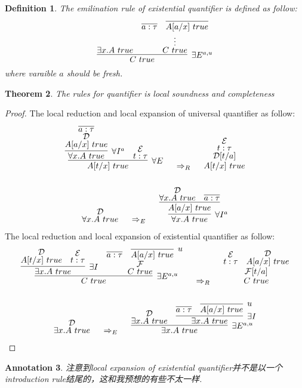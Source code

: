 \documentclass{article}
\theoremstyle{plain}
\newtheorem{theorem}{Theorem}
\newtheorem{definition}[theorem]{Definition}
\newtheorem{annotation}[theorem]{Annotation}
\theoremstyle{nonumberplain}
\newtheorem{proof}{Proof}
\begin{document}
\begin{definition}
\rm The emilination rule of existential quantifier is defined as follow:
$$
\infer[\exists E^{a,u}]{C~true}{\exists x.A~true & \deduce{C~true}{\deduce{\vdots}{\infer{a:\tau}{} & \infer{A[a/x]~true}{}}}}
$$
where varaible $a$ should be fresh. 
\end{definition}

\begin{theorem}
\rm The rules for quantifier is local soundness and completeness
\end{theorem}

\begin{proof}
\rm The local reduction and local expansion of universal quantifier as follow:
$$
\begin{gathered}
\infer[\forall E]{A[t/x]~true}{\infer[\forall I^a]{\forall x. A~true}{\deduce{A[a/x]~true}{\deduce{\mathcal{D}}{\infer{a:\tau}{}}}} & \deduce{t:\tau}{\mathcal{E}}} ~~~~ \Rightarrow_R~~~~ \deduce{A[t/x]~true}{\deduce{\mathcal{D}[t/a]}{\deduce{t:\tau}{\mathcal{E}}}} \\ \\
\deduce{\forall x. A~true}{\mathcal{D}} ~~~~ \Rightarrow_E ~~~~\infer[\forall I^a]{\forall x. A~true}{\infer{A[a/x]~true}{\deduce{\forall x. A~true}{\mathcal{D}} & \infer{ a: \tau}{}}}
\end{gathered}
$$
The local reduction and local expansion of existential quantifier as follow:
$$
\begin{gathered}
\infer[\exists E^{a,u}]{C~true}{\infer[\exists I]{\exists x. A~true}{\deduce{A[t/x]~true}{\mathcal{D}} & \deduce{t:\tau}{\mathcal{E}}} & \deduce{C~true}{\deduce{\mathcal{F}}{\infer{a:\tau}{} & \infer[u]{A[a/x]~true}{}}}} ~~~~ \Rightarrow_R ~~~~ \deduce{C~true}{\deduce{\mathcal{F}[t/a]}{\deduce{t:\tau}{\mathcal{E}} & \deduce{A[a/x]~true}{\mathcal{D}}}} \\ \\
\deduce{\exists x.A~true}{\mathcal{D}}~~~~\Rightarrow_E ~~~~\infer[\exists E^{a,u}]{\exists x. A~true}{\deduce{\exists x.A~true}{\mathcal{D}} & \infer[\exists I]{\exists x.A~true}{\infer{a:\tau}{} & \infer[u]{A[a/x]~true}{}}}
\end{gathered}
$$
\end{proof}

\begin{annotation}
\rm 注意到local expansion of existential quantifier并不是以一个introduction rule结尾的，这和我预想的有些不太一样. 
\end{annotation}
\end{document}
